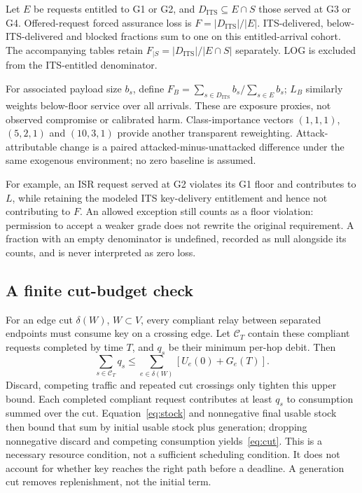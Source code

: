 \documentclass[conference,a4paper]{IEEEtran}
\begin{document}
Let $E$ be requests entitled to G1 or G2, and $D_{\mathrm{ITS}}\subseteq E\cap S$ those served at G3 or G4. Offered-request forced assurance loss is $F=|D_{\mathrm{ITS}}|/|E|$. ITS-delivered, below-ITS-delivered and blocked fractions sum to one on this entitled-arrival cohort. The accompanying tables retain $F_{\mid S}=|D_{\mathrm{ITS}}|/|E\cap S|$ separately. LOG is excluded from the ITS-entitled denominator.

For associated payload size $b_s$, define $F_B=\sum_{s\in D_{\mathrm{ITS}}}b_s/\sum_{s\in E}b_s$; $L_B$ similarly weights below-floor service over all arrivals. These are exposure proxies, not observed compromise or calibrated harm. Class-importance vectors $(1,1,1)$, $(5,2,1)$ and $(10,3,1)$ provide another transparent reweighting. Attack-attributable change is a paired attacked-minus-unattacked difference under the same exogenous environment; no zero baseline is assumed.

For example, an ISR request served at G2 violates its G1 floor and contributes to $L$, while retaining the modeled ITS key-delivery entitlement and hence not contributing to $F$. An allowed exception still counts as a floor violation: permission to accept a weaker grade does not rewrite the original requirement. A fraction with an empty denominator is undefined, recorded as null alongside its counts, and is never interpreted as zero loss.

\subsection{A finite cut-budget check}\label{sec:bound}
For an edge cut $\delta(W)$, $W\subset V$, every compliant relay between separated endpoints must consume key on a crossing edge. Let $\mathcal C_T$ contain these compliant requests completed by time $T$, and $q_s$ be their minimum per-hop debit. Then
\begin{equation}\label{eq:cut}
\sum_{s\in\mathcal C_T}q_s
\leq\sum_{e\in\delta(W)}\left[U_e(0)+G_e(T)\right].
\end{equation}
Discard, competing traffic and repeated cut crossings only tighten this upper bound. Each completed compliant request contributes at least $q_s$ to consumption summed over the cut. Equation~\ref{eq:stock} and nonnegative final usable stock then bound that sum by initial usable stock plus generation; dropping nonnegative discard and competing consumption yields~\eqref{eq:cut}. This is a necessary resource condition, not a sufficient scheduling condition. It does not account for whether key reaches the right path before a deadline. A generation cut removes replenishment, not the initial term.
\end{document}
